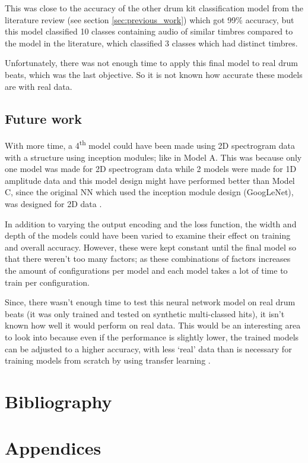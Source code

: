 \documentclass[12pt]{article}
\begin{document}
	This was close to the accuracy of the other drum kit classification model from the literature review (see section \ref{sec:previous_work}) which got 99\% accuracy, but this model classified 10 classes containing audio of similar timbres compared to the model in the literature, which classified 3 classes which had distinct timbres.\medskip
	
	Unfortunately, there was not enough time to apply this final model to real drum beats, which was the last objective. So it is not known how accurate these models are with real data. 
	
	\subsection{Future work}
    
    With more time, a 4\textsuperscript{th} model could have been made using 2D spectrogram data with a structure using inception modules; like in Model A. This was because only one model was made for 2D spectrogram data while 2 models were made for 1D amplitude data and this model design might have performed better than Model C, since the original NN which used the inception module design (GoogLeNet), was designed for 2D data \parencite{Oord2016}.\medskip
    
    In addition to varying the output encoding and the loss function, the width and depth of the models could have been varied to examine their effect on training and overall accuracy. However, these were kept constant until the final model so that there weren't too many factors; as these combinations of factors increases the amount of configurations per model and each model takes a lot of time to train per configuration.\medskip
    
    Since, there wasn't enough time to test this neural network model on real drum beats (it was only trained and tested on synthetic multi-classed hits), it isn't known how well it would perform on real data. This would be an interesting area to look into because even if the performance is slightly lower, the trained models can be adjusted to a higher accuracy, with less `real' data than is necessary for training models from scratch by using transfer learning \parencite{Asadi2007}.\medskip
    

	\newpage
	\nocite{*}
	\section{Bibliography}
	\medskip
	\printbibliography[notkeyword={figure}, title={References}]
	\printbibliography[type={misc}, keyword={figure}, title={Figures}]
	\newpage
	\section{Appendices}
	
\end{document}
